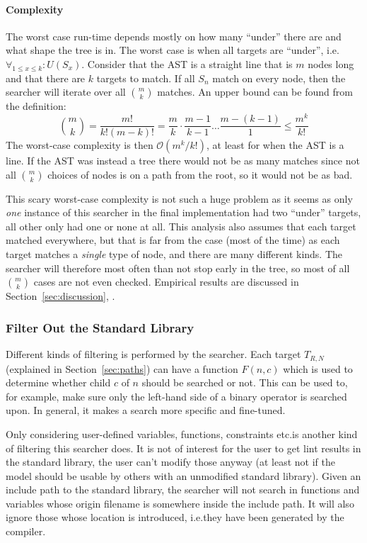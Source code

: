 \documentclass[a4paper,12pt]{article}
\newcommand{\Oh}[1]{\mathcal{O} (#1)}
\begin{document}
\paragraph{Complexity}
The worst case run-time depends mostly on how many ``under'' there are and what shape the
tree is in. The worst case is when all targets are ``under'', i.e.\@ $\forall_{1 \leq x
  \leq k} : U(S_x)$. Consider that the AST is a straight line that is $m$
nodes long and that there are $k$ targets to match. If all $S_n$ match on every node, then the
searcher will iterate over all $\binom{m}{k}$ matches. An upper bound can be found from the
definition:
\begin{equation*}
  \binom{m}{k} = \frac{m!}{k! (m-k)!} = \frac{m}{k} \cdot \frac{m-1}{k-1} \dots \frac{m -
    (k-1)}{1} \leq \frac{m^k}{k!}
\end{equation*}%
The worst-case complexity is then $\Oh{{m^k}/{k!}}$, at least for when the AST is a line.
If the AST was instead a tree there would not be as many matches since not all
$\binom{m}{k}$ choices of nodes is on a path from the root, so it would not be as bad.

This scary worst-case complexity is not such a huge problem as it seems as only \emph{one}
instance of this searcher in the final implementation had two ``under'' targets, all other
only had one or none at all. This analysis also assumes that each target matched
everywhere, but that is far from the case (most of the time) as each target matches a
\emph{single} type of node, and there are many different kinds. The searcher will
therefore most often than not stop early in the tree, so most of all $\binom{m}{k}$ cases
are not even checked. Empirical results are discussed in Section~\ref{sec:discussion},
.

\subsubsection{Filter Out the Standard Library}\label{sec:filter:stdlib}
Different kinds of filtering is performed by the searcher. Each target $T_{R,N}$
(explained in Section~\ref{sec:paths}) can have a function $F(n,c)$ which is used to
determine whether child $c$ of $n$ should be searched or not. This can be used to, for
example, make sure only the left-hand side of a binary operator is searched upon. In
general, it makes a search more specific and fine-tuned.

Only considering user-defined variables, functions, constraints etc.\@ is another kind of
filtering this searcher does. It is not of interest for the user to get lint results in
the standard library, the user can't modify those anyway (at least not if the model should
be usable by others with an unmodified standard library). Given an include path to the
standard library, the searcher will not search in functions and variables whose origin
filename is somewhere inside the include path. It will also ignore those whose location is
introduced, i.e.\@ they have been generated by the compiler.
\end{document}
